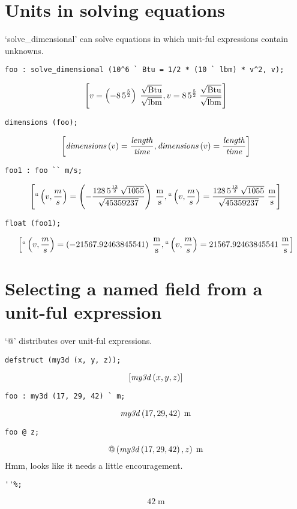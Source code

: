 \documentclass[12pt]{article}
\begin{document}
\section{Units in solving equations
}
`solve_dimensional' can solve equations in which unit-ful expressions contain unknowns.
\begin{verbatim}
foo : solve_dimensional (10^6 ` Btu = 1/2 * (10 ` lbm) * v^2, v);
\end{verbatim}
$$\left[ v=\left(-8\,5^{{{5}\over{2}}}\right)\;{{\sqrt{\mathrm{Btu}}
 }\over{\sqrt{\mathrm{lbm}}}} , v=8\,5^{{{5}\over{2}}}\;{{\sqrt{
 \mathrm{Btu}}}\over{\sqrt{\mathrm{lbm}}}} \right] $$
\begin{verbatim}
dimensions (foo);
\end{verbatim}
$$\left[ {\it dimensions}\left(v\right)={{{\it length}}\over{
 {\it time}}} , {\it dimensions}\left(v\right)={{{\it length}}\over{
 {\it time}}} \right] $$
\begin{verbatim}
foo1 : foo `` m/s;
\end{verbatim}
$$\left[ {\it ``}\left(v , {{m}\over{s}}\right)=\left(-{{128\,5^{{{13
 }\over{2}}}\,\sqrt{1055}}\over{\sqrt{45359237}}}\right)\;{{
 \mathrm{m}}\over{\mathrm{s}}} , {\it ``}\left(v , {{m}\over{s}}
 \right)={{128\,5^{{{13}\over{2}}}\,\sqrt{1055}}\over{\sqrt{45359237}
 }}\;{{\mathrm{m}}\over{\mathrm{s}}} \right] $$
\begin{verbatim}
float (foo1);
\end{verbatim}
$$\left[ {\it ``}\left(v , {{m}\over{s}}\right)=\left(-
 21567.92463845541\right)\;{{\mathrm{m}}\over{\mathrm{s}}} , {\it ``}
 \left(v , {{m}\over{s}}\right)=21567.92463845541\;{{\mathrm{m}
 }\over{\mathrm{s}}} \right] $$
\section{Selecting a named field from a unit-ful expression
}
`@' distributes over unit-ful expressions.
\begin{verbatim}
defstruct (my3d (x, y, z));
\end{verbatim}
$$\left[ {\it my3d}\left(x , y , z\right) \right] $$
\begin{verbatim}
foo : my3d (17, 29, 42) ` m;
\end{verbatim}
$${\it my3d}\left(17 , 29 , 42\right)\;\mathrm{m}$$
\begin{verbatim}
foo @ z;
\end{verbatim}
$$@\left({\it my3d}\left(17 , 29 , 42\right) , z\right)\;\mathrm{m}$$
Hmm, looks like it needs a little encouragement.
\begin{verbatim}
''%;
\end{verbatim}
$$42\;\mathrm{m}$$
\end{document}

